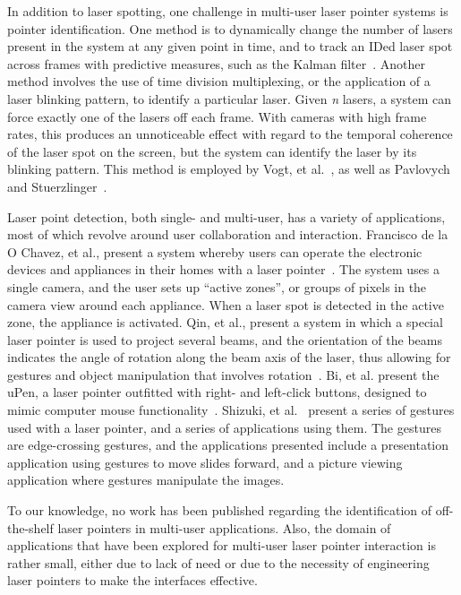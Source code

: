 \documentclass[review]{vgtc}                 %
\begin{document}
In addition to laser spotting, one challenge in multi-user laser
pointer systems is pointer identification. One method is to
dynamically change the number of lasers present in the system at any
given point in time, and to track an IDed laser spot across frames
with predictive measures, such as the Kalman
filter~\cite{Oh02laserpointers,Davis00lumipoint:multi-user,Cheng:2003:DIL:857080.857088}.
Another method involves the use of time division multiplexing, or the
application of a laser blinking pattern, to identify a particular
laser. Given \emph{n} lasers, a system can force exactly one of the
lasers off each frame. With cameras with high frame rates, this
produces an unnoticeable effect with regard to the temporal coherence
of the laser spot on the screen, but the system can identify the laser
by its blinking pattern. This method is employed by Vogt, et
al.~\cite{Vogt:2004:ECG:1009379.1009663,Vogt03trackingmultiple}, as
well as Pavlovych and Stuerzlinger~\cite{Pavlovych04laserpointers}.

Laser point detection, both single- and multi-user, has a variety of
applications, most of which revolve around user collaboration and
interaction. Francisco de la O Chavez, et al., present a system
whereby users can operate the electronic devices and appliances in
their homes with a laser pointer~\cite{delaOChavez:2008:INL:1387269.1387276}. The system uses a
single camera, and the user sets up ``active zones'', or groups of
pixels in the camera view around each appliance. When a laser spot is
detected in the active zone, the appliance is activated. Qin, et al.,
present a system in which a special laser pointer is used to project
several beams, and the orientation of the beams indicates the angle of
rotation along the beam axis of the laser, thus allowing for gestures
and object manipulation that involves rotation~\cite{Qin:2010:SLP:1842993.1843022}. Bi, et al. present the uPen, a
laser pointer outfitted with right- and left-click buttons, designed
to mimic computer mouse functionality~\cite{BiUpen}.
Shizuki, et al.~\cite{Shizuki:2006:LPI:1133265.1133284} present a series of 
gestures used with a laser pointer, and a series of applications using them.
The gestures are edge-crossing gestures, and the applications presented include 
a presentation application using gestures to move slides forward, and a picture 
viewing application where gestures manipulate the images.

To our knowledge, no work has been published regarding the
identification of off-the-shelf laser pointers in multi-user
applications. Also, the domain of applications that have been explored
for multi-user laser pointer interaction is rather small, either due
to lack of need or due to the necessity of engineering laser pointers
to make the interfaces effective.
\end{document}
